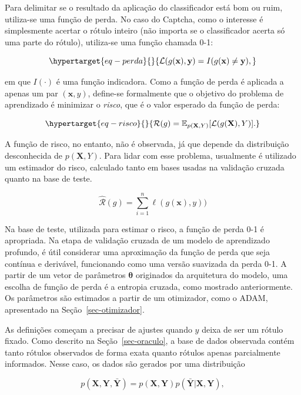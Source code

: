 \documentclass[12pt,twoside,brazilian]{book}
\begin{document}
Para delimitar se o resultado da aplicação do classificador está bom ou
ruim, utiliza-se uma função de perda. No caso do Captcha, como o
interesse é simplesmente acertar o rótulo inteiro (não importa se o
classificador acerta só uma parte do rótulo), utiliza-se uma função
chamada 0-1:

\begin{equation}\protect\hypertarget{eq-perda}{}{
\mathcal L(g(\mathbf x),\mathbf y) = I (g(\mathbf x) \neq \mathbf y),
}\label{eq-perda}\end{equation}

em que \(I(\cdot)\) é uma função indicadora. Como a função de perda é
aplicada a apenas um par \((\mathbf x,y)\), define-se formalmente que o
objetivo do problema de aprendizado é minimizar o \emph{risco}, que é o
valor esperado da função de perda:

\begin{equation}\protect\hypertarget{eq-risco}{}{
\mathcal R(g) = \mathbb E_{p(\mathbf X,Y)}[\mathcal L(g(\mathbf X),Y)].
}\label{eq-risco}\end{equation}

A função de risco, no entanto, não é observada, já que depende da
distribuição desconhecida de \(p(\mathbf X,Y)\). Para lidar com esse
problema, usualmente é utilizado um estimador do risco, calculado tanto
em bases usadas na validação cruzada quanto na base de teste.

\[
\hat{\mathcal R}(g) = \sum_{i=1}^n \ell(g(\mathbf x),y))
\]

Na base de teste, utilizada para estimar o risco, a função de perda 0-1
é apropriada. Na etapa de validação cruzada de um modelo de aprendizado
profundo, é útil considerar uma aproximação da função de perda que seja
contínua e derivável, funcionando como uma versão suavizada da perda
0-1. A partir de um vetor de parâmetros \(\boldsymbol \theta\)
originados da arquitetura do modelo, uma escolha de função de perda é a
entropia cruzada, como mostrado anteriormente. Os parâmetros são
estimados a partir de um otimizador, como o ADAM, apresentado na
Seção~\ref{sec-otimizador}.

As definições começam a precisar de ajustes quando \(y\) deixa de ser um
rótulo fixado. Como descrito na Seção~\ref{sec-oraculo}, a base de dados
observada contém tanto rótulos observados de forma exata quanto rótulos
apenas parcialmente informados. Nesse caso, os dados são gerados por uma
distribuição

\[
p(\mathbf X,\mathbf Y,\bar{\mathbf Y})=p(\mathbf X, \mathbf Y)p(\bar{\mathbf Y}|\mathbf X,\mathbf Y),
\]
\end{document}
